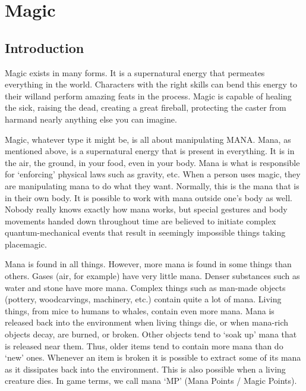 \documentclass[twoside]{book}
\begin{document}
    

\chapter{Magic}
    
    

\section{Introduction}
    
    {  
     Magic exists in many forms. It is a supernatural
             energy that permeates everything in the world. Characters
             with the right skills can bend this energy to their
             willand perform amazing feats in the process. Magic
             is capable of healing the sick, raising the dead, creating a
             great fireball, protecting the caster from harmand
             nearly anything else you can imagine. 
    }
  
    {  
     Magic, whatever type it might be, is all about
             manipulating MANA. Mana, as mentioned above, is a
             supernatural energy that is present in everything. It is in
             the air, the ground, in your food, even in your body. Mana
             is what is responsible for `enforcing' physical
             laws such as gravity, etc. When a person uses magic, they
             are manipulating mana to do what they want. Normally, this
             is the mana that is in their own body. It is possible to
             work with mana outside one's body as well. Nobody
             really knows exactly how mana works, but special gestures
             and body movements handed down throughout time are believed
             to initiate complex quantum-mechanical events that result in
             seemingly impossible things taking placemagic.
             
    }
  
    {  
     Mana is found in all things. However, more mana is
             found in some things than others. Gases (air, for example)
             have very little mana. Denser substances such as water and
             stone have more mana. Complex things such as man-made
             objects (pottery, woodcarvings, machinery, etc.) contain
             quite a lot of mana. Living things, from mice to humans to
             whales, contain even more mana. Mana is released back into
             the environment when living things die, or when mana-rich
             objects decay, are burned, or broken. Other objects tend to
             `soak up' mana that is released near them. Thus,
             older items tend to contain more mana than do
             `new' ones. Whenever an item is broken it is
             possible to extract some of its mana as it dissipates back
             into the environment. This is also possible when a living
             creature dies. In game terms, we call mana `MP'
             (Mana Points / Magic Points). 
    }
  
\end{document}

